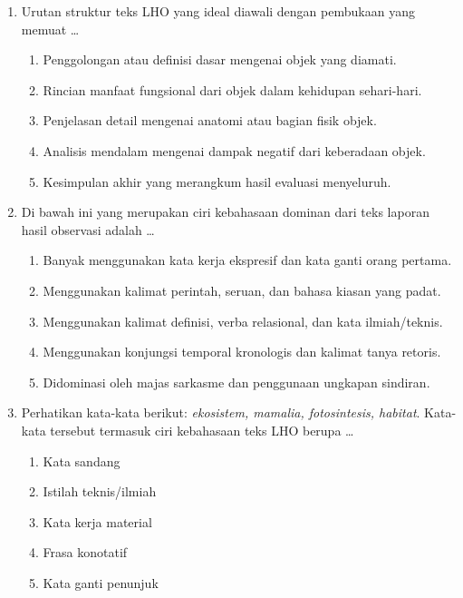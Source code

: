 \documentclass[12pt,a4paper]{article}
\begin{document}
\begin{enumerate}[leftmargin=*]
\item Urutan struktur teks LHO yang ideal diawali dengan pembukaan yang memuat \dots
    \begin{enumerate}[label=\alph*.]
        \item Penggolongan atau definisi dasar mengenai objek yang diamati.
        \item Rincian manfaat fungsional dari objek dalam kehidupan sehari-hari.
        \item Penjelasan detail mengenai anatomi atau bagian fisik objek.
        \item Analisis mendalam mengenai dampak negatif dari keberadaan objek.
        \item Kesimpulan akhir yang merangkum hasil evaluasi menyeluruh.
    \end{enumerate}

\item Di bawah ini yang merupakan ciri kebahasaan dominan dari teks laporan hasil observasi adalah \dots
    \begin{enumerate}[label=\alph*.]
        \item Banyak menggunakan kata kerja ekspresif dan kata ganti orang pertama.
        \item Menggunakan kalimat perintah, seruan, dan bahasa kiasan yang padat.
        \item Menggunakan kalimat definisi, verba relasional, dan kata ilmiah/teknis.
        \item Menggunakan konjungsi temporal kronologis dan kalimat tanya retoris.
        \item Didominasi oleh majas sarkasme dan penggunaan ungkapan sindiran.
    \end{enumerate}

\item Perhatikan kata-kata berikut: \textit{ekosistem, mamalia, fotosintesis, habitat}. Kata-kata tersebut termasuk ciri kebahasaan teks LHO berupa \dots
    \begin{enumerate}[label=\alph*.]
        \item Kata sandang
        \item Istilah teknis/ilmiah
        \item Kata kerja material
        \item Frasa konotatif
        \item Kata ganti penunjuk
    \end{enumerate}


\end{enumerate}
\end{document}
